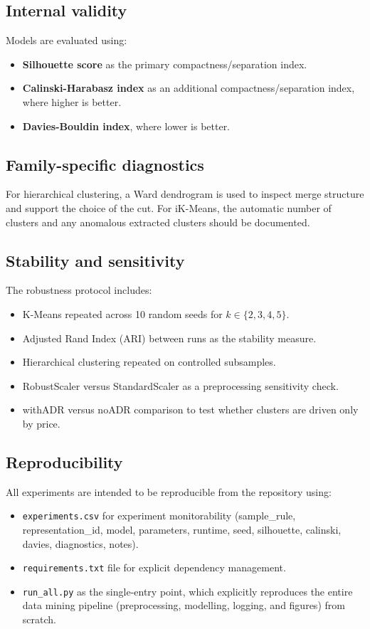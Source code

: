 \documentclass[11pt,a4paper]{article}
\begin{document}
\subsection{Internal validity}
Models are evaluated using:
\begin{itemize}
    \item \textbf{Silhouette score} as the primary compactness/separation index.
    \item \textbf{Calinski-Harabasz index} as an additional compactness/separation index, where higher is better.
    \item \textbf{Davies-Bouldin index}, where lower is better.
\end{itemize}

\subsection{Family-specific diagnostics}
For hierarchical clustering, a Ward dendrogram is used to inspect merge structure and support the choice of the cut. For iK-Means, the automatic number of clusters and any anomalous extracted clusters should be documented.

\subsection{Stability and sensitivity}
The robustness protocol includes:
\begin{itemize}
    \item K-Means repeated across 10 random seeds for $k \in \{2,3,4,5\}$.
    \item Adjusted Rand Index (ARI) between runs as the stability measure.
    \item Hierarchical clustering repeated on controlled subsamples.
    \item RobustScaler versus StandardScaler as a preprocessing sensitivity check.
    \item withADR versus noADR comparison to test whether clusters are driven only by price.
\end{itemize}

\subsection{Reproducibility}
All experiments are intended to be reproducible from the repository using:
\begin{itemize}
    \item \texttt{experiments.csv} for experiment monitorability (sample\_rule, representation\_id, model, parameters, runtime, seed, silhouette, calinski, davies, diagnostics, notes).
    \item \texttt{requirements.txt} file for explicit dependency management.
    \item \texttt{run\_all.py} as the single-entry point, which explicitly reproduces the entire data mining pipeline (preprocessing, modelling, logging, and figures) from scratch.
\end{itemize}
\end{document}
